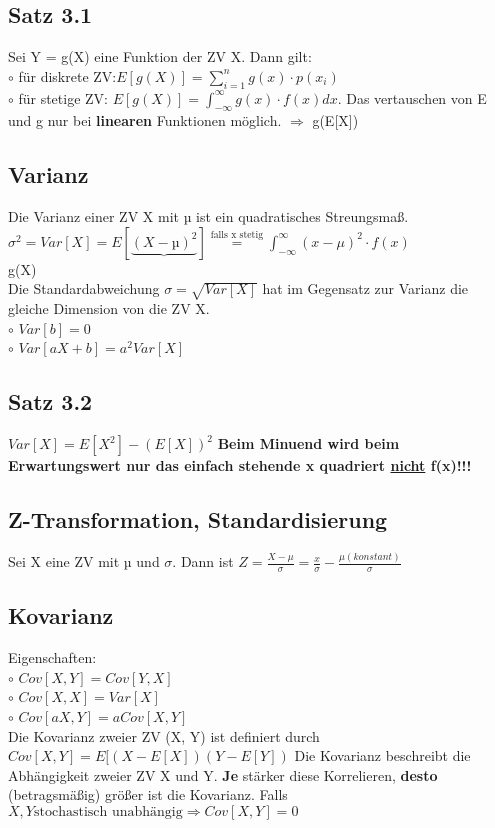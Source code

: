 \subsection{Satz 3.1}
Sei Y = g(X) eine Funktion der ZV X. Dann gilt:\\
  $\circ$ für diskrete ZV:$E[g(X)] = \sum_{i=1}^{n} g(x) \cdot p(x_ {i})$\\
  $\circ$ für stetige ZV: $E[g(X)] = \int_{- \infty}^{\infty} g(x) \cdot f(x) dx$. Das vertauschen von E und g nur bei \textbf{linearen} Funktionen möglich. $\Rightarrow$ g(E[X])
\subsection{Varianz}
Die Varianz einer ZV X mit µ ist ein quadratisches Streungsmaß. $\sigma^2 = Var[X] = E[\underbrace{(X - µ)^2}] \stackrel{\text{falls x stetig}}{=} \int_{-\infty}^{\infty} (x-\mu)^2 \cdot f(x)$\\
g(X)\\
Die Standardabweichung $\sigma = \sqrt{Var[X]}$ hat im Gegensatz zur Varianz die gleiche Dimension von die ZV X.\\
  $\circ$ $Var[b] = 0$\\
  $\circ$ $Var[aX + b] = a^2 Var[X]$
\subsection{Satz 3.2}
$Var[X] = E[X^2] - (E[X])^2$ \textbf{Beim Minuend wird beim Erwartungswert nur das einfach stehende x quadriert \underline{nicht} f(x)!!!}
\subsection{Z-Transformation, Standardisierung}
Sei X eine ZV mit µ und $\sigma$. Dann ist $Z = \frac{X - \mu}{\sigma} = \frac{x}{\sigma} - \frac{\mu (konstant)}{\sigma}$ 
\subsection{Kovarianz}
Eigenschaften:\\
  $\circ$ $Cov[X, Y] = Cov[Y,X]$\\
  $\circ$ $Cov[X, X] = Var[X]$\\
  $\circ$ $Cov[aX, Y] = a Cov[X,Y]$\\
Die Kovarianz zweier ZV (X, Y) ist definiert durch
$Cov[X, Y] = E[(X - E[X])(Y-E[Y])$
Die Kovarianz beschreibt die Abhängigkeit zweier ZV X und Y. \textbf{Je} stärker diese Korrelieren, \textbf{desto} (betragsmäßig) größer ist die Kovarianz. Falls $X, Y \text{stochastisch unabhängig} \Rightarrow Cov[X, Y] = 0$ 
